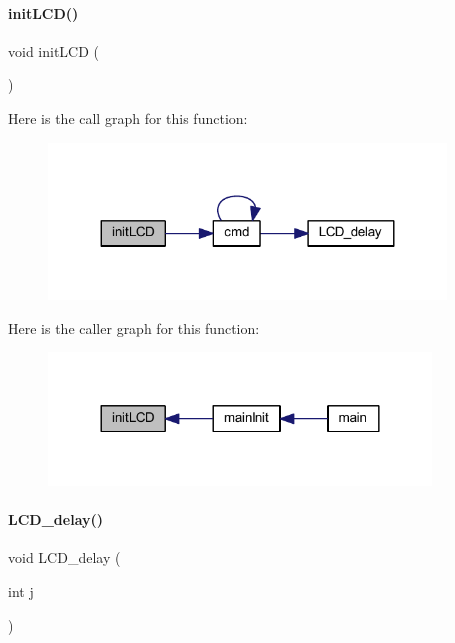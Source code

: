 \paragraph{init\+L\+C\+D()}
{\footnotesize\ttfamily void init\+L\+CD (\begin{DoxyParamCaption}{ }\end{DoxyParamCaption})}

Here is the call graph for this function\+:
\nopagebreak
\begin{figure}[H]
\begin{center}
\leavevmode
\includegraphics[width=299pt]{a00035_a08529d00f32f8441dc7669b1a1d3783c_cgraph}
\end{center}
\end{figure}
Here is the caller graph for this function\+:
\nopagebreak
\begin{figure}[H]
\begin{center}
\leavevmode
\includegraphics[width=288pt]{a00035_a08529d00f32f8441dc7669b1a1d3783c_icgraph}
\end{center}
\end{figure}
\mbox{\label{a00035_a43354028a3c697c67905dc7e55e6de8d}} 
\paragraph{L\+C\+D\+\_\+delay()}
{\footnotesize\ttfamily void L\+C\+D\+\_\+delay (\begin{DoxyParamCaption}\item[{int}]{j }\end{DoxyParamCaption})}

